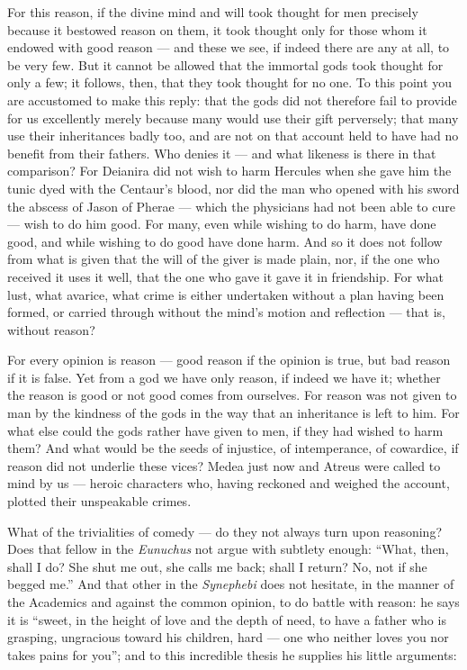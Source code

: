  For this reason, if the divine mind and will took thought for men precisely because it bestowed reason on them, it took thought only for those whom it endowed with good reason — and these we see, if indeed there are any at all, to be very few. But it cannot be allowed that the immortal gods took thought for only a few; it follows, then, that they took thought for no one. To this point you are accustomed to make this reply: that the gods did not therefore fail to provide for us excellently merely because many would use their gift perversely; that many use their inheritances badly too, and are not on that account held to have had no benefit from their fathers. Who denies it — and what likeness is there in that comparison? For Deianira did not wish to harm Hercules when she gave him the tunic dyed with the Centaur's blood, nor did the man who opened with his sword the abscess of Jason of Pherae — which the physicians had not been able to cure — wish to do him good. For many, even while wishing to do harm, have done good, and while wishing to do good have done harm. And so it does not follow from what is given that the will of the giver is made plain, nor, if the one who received it uses it well, that the one who gave it gave it in friendship. For what lust, what avarice, what crime is either undertaken without a plan having been formed, or carried through without the mind's motion and reflection — that is, without reason?

 For every opinion is reason — good reason if the opinion is true, but bad reason if it is false. Yet from a god we have only reason, if indeed we have it; whether the reason is good or not good comes from ourselves. For reason was not given to man by the kindness of the gods in the way that an inheritance is left to him. For what else could the gods rather have given to men, if they had wished to harm them? And what would be the seeds of injustice, of intemperance, of cowardice, if reason did not underlie these vices? Medea just now and Atreus were called to mind by us — heroic characters who, having reckoned and weighed the account, plotted their unspeakable crimes.

 What of the trivialities of comedy — do they not always turn upon reasoning? Does that fellow in the \textit{Eunuchus} not argue with subtlety enough: ``What, then, shall I do? She shut me out, she calls me back; shall I return? No, not if she begged me.'' And that other in the \textit{Synephebi} does not hesitate, in the manner of the Academics and against the common opinion, to do battle with reason: he says it is ``sweet, in the height of love and the depth of need, to have a father who is grasping, ungracious toward his children, hard — one who neither loves you nor takes pains for you''; and to this incredible thesis he supplies his little arguments:

